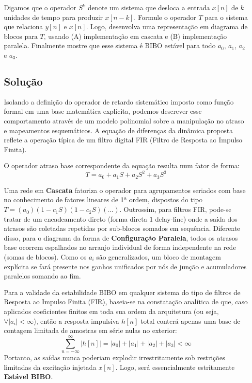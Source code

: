 \documentclass[tcc]{classe_uftex/uftex}
\begin{document}
Digamos que o operador $S^k$ denote um sistema que desloca a entrada $x[n]$ de $k$ unidades de tempo para produzir $x[n-k]$. Formule o operador $T$ para o sistema que relaciona $y[n]$ e $x[n]$. Logo, desenvolva uma representação em diagrama de blocos para $T$, usando (A) implementação em cascata e (B) implementação paralela. Finalmente mostre que esse sistema é BIBO est\'avel para todo $a_0$, $a_1$, $a_2$ e $a_3$.

\subsection*{Solução}

Isolando a definição do operador de retardo sistemático imposto como função formal em uma base matemática explícita, podemos descrever esse comportamento através de um modelo polinomial sobre a manipulação no atraso e mapeamentos esquemáticos.
A equação de diferenças da dinâmica proposta reflete a operação típica de um filtro digital FIR (Filtro de Resposta ao Impulso Finita).

O operador atraso base correspondente da equação resulta num fator de forma:
\begin{equation}
    T = a_0 + a_1 S + a_2 S^2 + a_3 S^3
\end{equation}

Uma rede em \textbf{Cascata} fatoriza o operador para agrupamentos seriados com base no conhecimento de fatores lineares de 1ª ordem, dispostos do tipo $T = (a_0) (1 - c_1 S)(1 - c_2 S)(...)$. Outrossim, para filtros FIR, pode-se tratar de um encadeamento direto (forma direta 1 delay-line) onde a saída dos atrasos são coletadas repetidas por sub-blocos somados em sequência. Diferente disso, para o diagrama da forma de \textbf{Configuração Paralela}, todos os atrasos base ocorrem espalhados no arranjo individual de forma independente na rede (somas de blocos). Como os $a_i$ são generalizados, um bloco de montagem explícita se fará presente nos ganhos unificados por nós de junção e acumuladores paralelos somando ao fim.

Para a validade da estabilidade BIBO em qualquer sistema do tipo de filtros de Resposta ao Impulso Finita (FIR), baseia-se na constatação analítica de que, caso aplicados coeficientes finitos em toda sua ordem da arquitetura (ou seja, $\forall |a_i| < \infty$), então a resposta impulsiva $h[n]$ total conterá apenas uma base de contagem limitada de amostras em série nulas no exterior:
\begin{equation}
    \sum_{n=-\infty}^\infty |h[n]| = |a_0| + |a_1| + |a_2| + |a_3| < \infty
\end{equation}
Portanto, as saídas nunca poderiam explodir irrestritamente sob restrições limitadas da excitação injetada $x[n]$. Logo, será essencialmente estritamente \textbf{Estável BIBO}.
\end{document}
